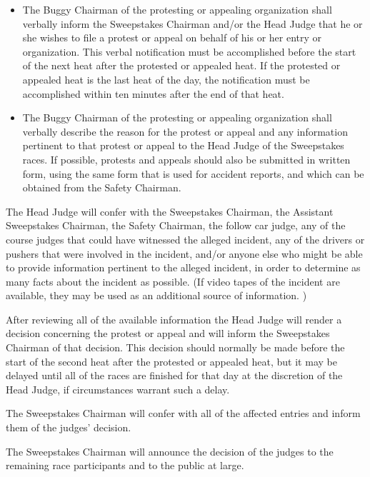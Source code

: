 	\begin{itemize}

		\item
		The Buggy Chairman of the protesting or appealing organization shall verbally
		inform the Sweepstakes Chairman and/or the Head Judge that he or she wishes to
		file a protest or appeal on behalf of his or her entry or organization. This
		verbal notification must be accomplished before the start of the next heat
		after the protested or appealed heat. If the protested or appealed heat is the
		last heat of the day, the notification must be accomplished within ten minutes
		after the end of that heat.

		\item
		The Buggy Chairman of the protesting or appealing organization shall verbally
		describe the reason for the protest or appeal and any information pertinent to
		that protest or appeal to the Head Judge of the Sweepstakes races. If possible,
		protests and appeals should also be submitted in written form, using the same
		form that is used for accident reports, and which can be obtained from the
		Safety Chairman.

	\end{itemize}

	The Head Judge will confer with the Sweepstakes Chairman, the Assistant
	Sweepstakes Chairman, the Safety Chairman, the follow car judge, any of the
	course judges that could have witnessed the alleged incident, any of the
	drivers or pushers that were involved in the incident, and/or anyone else who
	might be able to provide information pertinent to the alleged incident, in
	order to determine as many facts about the incident as possible. (If video
	tapes of the incident are available, they may be used as an additional source
	of information. )

	After reviewing all of the available information the Head Judge will render a
	decision concerning the protest or appeal and will inform the Sweepstakes
	Chairman of that decision. This decision should normally be made before the
	start of the second heat after the protested or appealed heat, but it may be
	delayed until all of the races are finished for that day at the discretion of
	the Head Judge, if circumstances warrant such a delay.

	The Sweepstakes Chairman will confer with all of the affected entries and
	inform them of the judges' decision.

	The Sweepstakes Chairman will announce the decision of the judges to the
	remaining race participants and to the public at large.
	\newline

